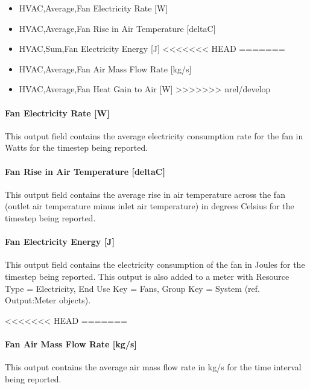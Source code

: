 \begin{itemize}
\item
  HVAC,Average,Fan Electricity Rate {[}W{]}
\item
  HVAC,Average,Fan Rise in Air Temperature {[}deltaC{]}
\item
  HVAC,Sum,Fan Electricity Energy {[}J{]}
<<<<<<< HEAD
=======
\item
  HVAC,Average,Fan Air Mass Flow Rate {[}kg/s{]}
\item
  HVAC,Average,Fan Heat Gain to Air {[}W{]}
>>>>>>> nrel/develop
\end{itemize}

\paragraph{Fan Electricity Rate {[}W{]}}\label{fan-electric-power-w-4}

This output field contains the average electricity consumption rate for the fan in Watts for the timestep being reported.

\paragraph{Fan Rise in Air Temperature {[}deltaC{]}}\label{fan-rise-in-air-temperature-deltac-4}

This output field contains the average rise in air temperature across the fan (outlet air temperature minus inlet air temperature) in degrees Celsius for the timestep being reported.

\paragraph{Fan Electricity Energy {[}J{]}}\label{fan-electric-energy-j-4}

This output field contains the electricity consumption of the fan in Joules for the timestep being reported. This output is also added to a meter with Resource Type = Electricity, End Use Key = Fans, Group Key = System (ref. Output:Meter objects).

<<<<<<< HEAD
=======
\paragraph{Fan Air Mass Flow Rate {[}kg/s{]}}\label{fan-air-mass-flow-kgs-4}

This output contains the average air mass flow rate in kg/s for the time interval being reported.

